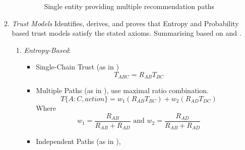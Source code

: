 \begin{itemize}
\begin{enumerate}
\begin{enumerate}
            \begin{figure}[H!]
              \caption{Single entity providing multiple recommendation paths}
              \label{liu2006_multipath_propagation-dots}
            \end{figure}
        \end{enumerate}
      \item \emph{Trust Models}
      Identifies, derives, and proves that Entropy and Probability based trust
      models satisfy the stated axioms. Summarising based on
       and
      .
      \begin{enumerate}
        \item \emph{Entropy-Based}:
        \begin{itemize}
          \item Single-Chain Trust (as in
            )
            \begin{equation}
              T_{ABC}=R_{AB}T_{BC}
            \end{equation}
          \item Multiple Paths (as in
            ), use maximal ratio
            combination.
            \begin{equation}
              T\{A:C,action\}= w_1(R_{AB}T_{BC})+w_2(R_{AD}T_{DC})
            \end{equation}
            Where
            \begin{equation}
              w_1=\frac{R_{AB}}{R_{AB}+R_{AD}}
              \mbox{ and } w_2=\frac{R_{AD}}{R_{AB}+R_{AD}}
            \end{equation}
          \item Independent Paths (as in
            ),
        \end{itemize}
      \end{enumerate}





\end{enumerate}
\end{itemize}
